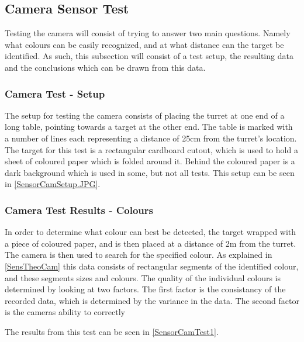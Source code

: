 \subsection{Camera Sensor Test}\label{CamTest}%
Testing the camera will consist of trying to answer two main questions. Namely
what colours can be easily recognized, and at what distance can the target be
identified. As such, this subsection will consist of a test setup, the resulting
data and the conclusions which can be drawn from this data.

\subsubsection{Camera Test - Setup}
The setup for testing the camera consists of placing the turret at one end of a
long table, pointing towards a target at the other end. The table is marked with
a number of lines each representing a distance of 25cm from the turret's
location. The target for this test is a rectangular cardboard cutout, which is
used to hold a sheet of coloured paper which is folded around it. Behind the
coloured paper is a dark background which is used in some, but not all tests.
This setup can be seen in \autoref{SensorCamSetup.JPG}.


\subsubsection{Camera Test Results - Colours}
In order to determine what colour can best be detected, the target wrapped with
a piece of coloured paper, and is then placed at a distance of 2m from the
turret. The camera is then used to search for the specified colour. As explained
in \autoref{SensTheoCam} this data consists of rectangular segments of the
identified colour, and these segments sizes and colours. The quality of the
individual colours is determined by looking at two factors. The first factor is
the consistancy of the recorded data, which is determined by the variance in the
data. The second factor is the cameras ability to correctly   


 The results from this test can be seen in
\autoref{SensorCamTest1}. 


















